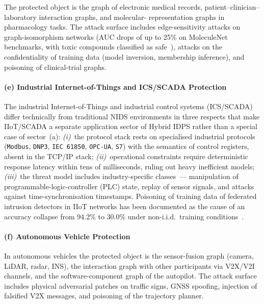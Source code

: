 The protected object is the graph of electronic medical records,
patient--clinician--laboratory interaction graphs, and molecular-
representation graphs in pharmacology tasks. The attack surface
includes edge-sensitivity attacks on graph-isomorphism networks
(AUC drops of up to 25\% on MoleculeNet benchmarks, with toxic
compounds classified as safe~\cite{EdgeSensitivity2025}), attacks on
the confidentiality of training data (model inversion, membership
inference), and poisoning of clinical-trial graphs.

\paragraph{(e) Industrial Internet-of-Things and ICS/SCADA Protection}\label{subsubsec:sector_iiot}

The industrial Internet-of-Things and industrial control systems
(ICS/SCADA) differ technically from traditional NIDS environments
in three respects that make IIoT/SCADA a separate application
sector of Hybrid IDPS rather than a special case of sector~(a):
\emph{(i)}~the protocol stack rests on specialised industrial
protocols (\texttt{Modbus}, \texttt{DNP3}, \texttt{IEC~61850},
\texttt{OPC-UA}, \texttt{S7}) with the semantics of control
registers, absent in the TCP/IP stack;
\emph{(ii)}~operational constraints require deterministic response
latency within tens of milliseconds, ruling out heavy inefficient
models;
\emph{(iii)}~the threat model includes industry-specific classes~---
manipulation of programmable-logic-controller (PLC) state, replay
of sensor signals, and attacks against time-synchronisation
timestamps. Poisoning of training data of federated intrusion
detectors in IIoT networks has been documented as the cause of an
accuracy collapse from 94.2\% to 30.0\% under non-i.i.d.\ training
conditions~\cite{FerragPoisoning2023}.

\paragraph{(f) Autonomous Vehicle Protection}\label{subsubsec:sector_av}

In autonomous vehicles the protected object is the sensor-fusion
graph (camera, LiDAR, radar, INS), the interaction graph with other
participants via V2X/V2I channels, and the software-component graph
of the autopilot. The attack surface includes physical adversarial
patches on traffic signs, GNSS spoofing, injection of falsified V2X
messages, and poisoning of the trajectory planner.

